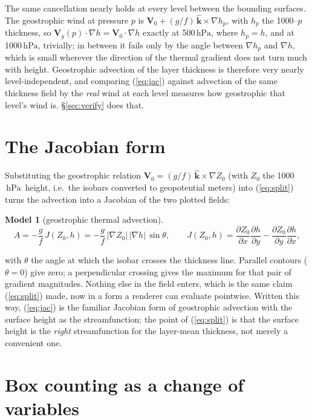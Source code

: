 \documentclass[11pt]{article}
\newtheorem*{model}{Model}
\newcommand{\hPa}{\ensuremath{\,\mathrm{hPa}}}
\begin{document}
The same cancellation nearly holds at every level between the bounding surfaces. The geostrophic wind at pressure $p$ is $\mathbf{V}_0 + (g/f)\,\hat{\mathbf{k}}\times\nabla h_p$, with $h_p$ the 1000--$p$ thickness, so $\mathbf{V}_g(p)\cdot\nabla h = \mathbf{V}_0\cdot\nabla h$ exactly at 500\hPa, where $h_p = h$, and at 1000\hPa, trivially; in between it fails only by the angle between $\nabla h_p$ and $\nabla h$, which is small wherever the direction of the thermal gradient does not turn much with height. Geostrophic advection of the layer thickness is therefore very nearly level-independent, and comparing (\ref{eq:jac}) against advection of the same thickness field by the \emph{real} wind at each level measures how geostrophic that level's wind is. \S\ref{sec:verify} does that.

\section{The Jacobian form}

Substituting the geostrophic relation $\mathbf{V}_0 = (g/f)\,\hat{\mathbf{k}}\times\nabla Z_0$ (with $Z_0$ the 1000\hPa\ height, i.e.\ the isobars converted to geopotential meters) into (\ref{eq:split}) turns the advection into a Jacobian of the two plotted fields:
\begin{model}[geostrophic thermal advection]
\begin{equation}
A = -\frac{g}{f}\,J(Z_0,h) = -\frac{g}{f}\,|\nabla Z_0|\,|\nabla h|\,\sin\theta,
\qquad
J(Z_0,h) = \frac{\partial Z_0}{\partial x}\frac{\partial h}{\partial y} - \frac{\partial Z_0}{\partial y}\frac{\partial h}{\partial x},
\label{eq:jac}
\end{equation}
\end{model}
\noindent with $\theta$ the angle at which the isobar crosses the thickness line. Parallel contours ($\theta = 0$) give zero; a perpendicular crossing gives the maximum for that pair of gradient magnitudes. Nothing else in the field enters, which is the same claim (\ref{eq:split}) made, now in a form a renderer can evaluate pointwise. Written this way, (\ref{eq:jac}) is the familiar Jacobian form of geostrophic advection with the surface height as the streamfunction; the point of (\ref{eq:split}) is that the surface height is the \emph{right} streamfunction for the layer-mean thickness, not merely a convenient one.

\section{Box counting as a change of variables}
\end{document}
